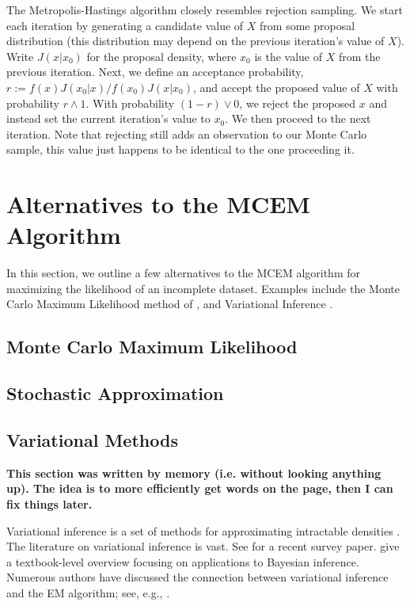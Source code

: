 \documentclass[11pt, oneside]{article}   	%
\begin{document}
The Metropolis-Hastings algorithm closely resembles rejection sampling. We start each iteration by generating a candidate value of $X$ from some proposal distribution (this distribution may depend on the previous iteration's value of $X$). Write $J(x | x_0)$ for the proposal density, where $x_0$ is the value of $X$ from the previous iteration. Next, we define an acceptance probability, $r := f(x) J(x_0 | x) / f(x_0) J(x | x_0)$, and accept the proposed value of $X$ with probability $r \wedge 1$. With probability $(1-r) \vee 0$, we reject the proposed $x$ and instead set the current iteration's value to $x_0$. We then proceed to the next iteration. Note that rejecting still adds an observation to our Monte Carlo sample, this value just happens to be identical to the one proceeding it.



\section{Alternatives to the MCEM Algorithm}

In this section, we outline a few alternatives to the MCEM algorithm for maximizing the likelihood of an incomplete dataset. Examples include the Monte Carlo Maximum Likelihood method of \citet{Gey94}, and Variational Inference \citep{Ble17, Tsi08}.

\subsection{Monte Carlo Maximum Likelihood}



\subsection{Stochastic Approximation}

\subsection{Variational Methods}

\textbf{This section was written by memory (i.e. without looking anything up). The idea is to more efficiently get words on the page, then I can fix things later.}

Variational inference is a set of methods for approximating intractable densities \citep{need}. The literature on variational inference is vast. See \citet{Ble17} for a recent survey paper. \citet[Section 13.7]{Gel13} give a textbook-level overview focusing on applications to Bayesian inference. Numerous authors have discussed the connection between variational inference and the EM algorithm; see, e.g., \citet{Nea98,Tsi08}.
\end{document}
